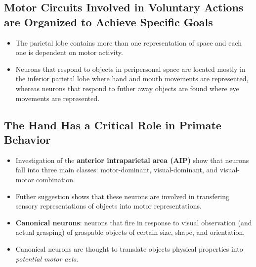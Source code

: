 \documentclass[12pt,a4paper]{article}
\begin{document}
\subsection{Motor Circuits Involved in Voluntary Actions are Organized to Achieve Specific Goals}
\begin{itemize}
    \item The parietal lobe contains more than one representation of space and each one is dependent on motor activity.
    \item Neurons that respond to objects in peripersonal space are located mostly in the inferior parietal lobe where hand and mouth movements are represented, whereas neurons that respond to futher away objects are found where eye movements are represented.
\end{itemize}

\subsection{The Hand Has a Critical Role in Primate Behavior}
\begin{itemize}
    \item Investigation of the \textbf{anterior intraparietal area (AIP)} show that neurons fall into three main classes: motor-dominant, visual-dominant, and visual-motor combination.
    \item Futher suggestion shows that these neurons are involved in transfering sensory representations of objects into motor representations.
    \item \textbf{Canonical neurons}: neurons that fire in response to visual observation (and actual grasping) of graspable objects of certain size, shape, and orientation.
    \item Canonical neurons are thought to translate objects physical properties into \textit{potential motor acts}.
\end{itemize}
\end{document}
